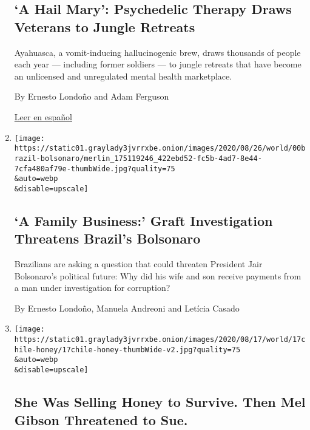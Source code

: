 \begin{enumerate}
  \hypertarget{a-hail-mary-psychedelic-therapy-draws-veterans-to-jungle-retreats}{%
  \subsection{`A Hail Mary': Psychedelic Therapy Draws Veterans to
  Jungle
  Retreats}\label{a-hail-mary-psychedelic-therapy-draws-veterans-to-jungle-retreats}}

  Ayahuasca, a vomit-inducing hallucinogenic brew, draws thousands of
  people each year --- including former soldiers --- to jungle retreats
  that have become an unlicensed and unregulated mental health
  marketplace.

  By Ernesto Londoño and Adam Ferguson

  \href{https://www.nytimes3xbfgragh.onion/es/2020/08/30/espanol/america-latina/ayahuasca-costa-rica.html}{Leer
  en español}
\item
  \href{/2020/08/28/world/americas/brazil-bosonaro-corruption.html}{}

  \texttt{[image: https://static01.graylady3jvrrxbe.onion/images/2020/08/26/world/00brazil-bolsonaro/merlin\_175119246\_422ebd52-fc5b-4ad7-8e44-7cfa480af79e-thumbWide.jpg?quality=75\\\&auto=webp\\\&disable=upscale]}

  \hypertarget{a-family-business-graft-investigation-threatens-brazils-bolsonaro}{%
  \subsection{`A Family Business:' Graft Investigation Threatens
  Brazil's
  Bolsonaro}\label{a-family-business-graft-investigation-threatens-brazils-bolsonaro}}

  Brazilians are asking a question that could threaten President Jair
  Bolsonaro's political future: Why did his wife and son receive
  payments from a man under investigation for corruption?

  By Ernesto Londoño, Manuela Andreoni and Letícia Casado
\item
  \href{/2020/08/17/world/americas/honey-mel-gibson-chile.html}{}

  \texttt{[image: https://static01.graylady3jvrrxbe.onion/images/2020/08/17/world/17chile-honey/17chile-honey-thumbWide-v2.jpg?quality=75\\\&auto=webp\\\&disable=upscale]}

  \hypertarget{she-was-selling-honey-to-survive-then-mel-gibson-threatened-to-sue}{%
  \subsection{She Was Selling Honey to Survive. Then Mel Gibson
  Threatened to
  Sue.}\label{she-was-selling-honey-to-survive-then-mel-gibson-threatened-to-sue}}


\end{enumerate}
